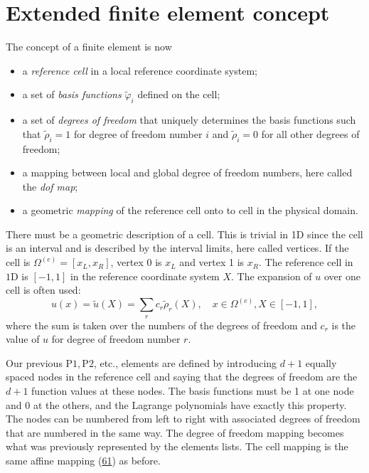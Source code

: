 \documentclass[../main.tex]{subfiles}
\begin{document}
	\section[Extended finite element concept]{Extended finite element concept}
	\label{sec:sec_6_2}
	The concept of a finite element is now
	\begin{itemize}
		\item a \textit{reference cell} in a local reference coordinate system;
		\item a set of \textit{basis functions} $\tilde{\varphi}_{i}$ defined on the cell;
		\item a set of \textit{degrees of freedom} that uniquely determines the basis functions such that $\tilde{\rho}_{i}=1$ for degree of freedom number $i$ and $\tilde{\rho}_{i}=0$ for all other degrees of freedom;
		\item a mapping between local and global degree of freedom numbers, here called the \textit{dof map};
		\item a geometric \textit{mapping} of the reference cell onto to cell in the physical domain.
	\end{itemize}
	There must be a geometric description of a cell. This is trivial in 1D since the
	cell is an interval and is described by the interval limits, here called vertices. If the cell is $\Omega^{(e)}=\left[x_{L}, x_{R}\right]$, vertex 0 is $x_{L}$ and vertex 1 is $x_{R}$. The reference cell in $1 \mathrm{D}$ is $[-1,1]$ in the reference coordinate system $X$.
	The expansion of $u$ over one cell is often used:
	\begin{equation}\label{eqa92}
		u(x)=\tilde{u}(X)=\sum_{r} c_{r} \tilde{\rho}_{r}(X), \quad x \in \Omega^{(e)}, X \in[-1,1],
	\end{equation}
	where the sum is taken over the numbers of the degrees of freedom and $c_{r}$ is the value of $u$ for degree of freedom number $r$.
	
	Our previous $\mathrm{P} 1, \mathrm{P} 2$, etc., elements are defined by introducing $d+1$ equally spaced nodes in the reference cell and saying that the degrees of freedom are the $d+1$ function values at these nodes. The basis functions must be 1 at one node and 0 at the others, and the Lagrange polynomials have exactly this property. The nodes can be numbered from left to right with associated degrees of freedom that are numbered in the same way. The degree of freedom mapping becomes what was previously represented by the elements lists. The cell mapping is the same affine mapping (\hyperref[eqa61]{61}) as before.
\end{document}

